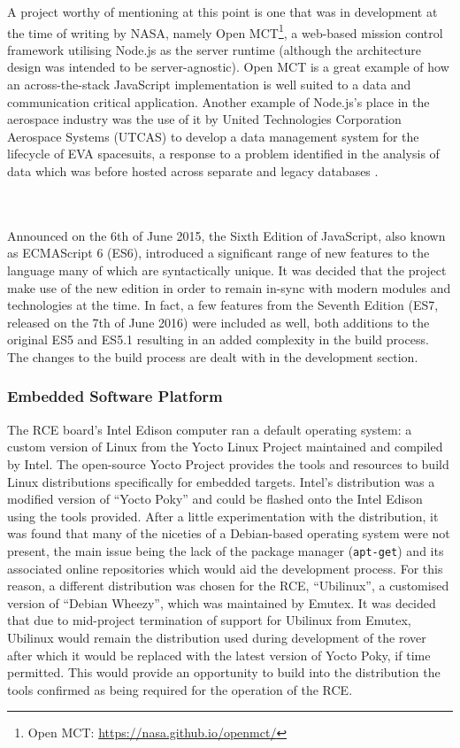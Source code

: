         A project worthy of mentioning at this point is one that was in development at the time of writing by NASA, namely Open MCT\footnote{Open MCT: \url{https://nasa.github.io/openmct/}}, a web-based mission control framework utilising Node.js as the server runtime (although the architecture design was intended to be server-agnostic). Open MCT is a great example of how an across-the-stack JavaScript implementation is well suited to a data and communication critical application. Another example of Node.js's place in the aerospace industry was the use of it by United Technologies Corporation Aerospace Systems (UTCAS) to develop a data management system for the lifecycle of EVA spacesuits, a response to a problem identified in the analysis of data which was before hosted across separate and legacy databases \cite{nodejsSpaceSuit_2016}.        
        
      \\\\
        Announced on the 6th of June 2015, the Sixth Edition of JavaScript, also known as ECMAScript 6 (ES6), introduced a significant range of new features to the language many of which are syntactically unique. It was decided that the project make use of the new edition in order to remain in-sync with modern modules and technologies at the time. In fact, a few features from the Seventh Edition (ES7, released on the 7th of June 2016) were included as well, both additions to the original ES5 and ES5.1 resulting in an added complexity in the build process. The changes to the build process are dealt with in the development section.
        
    \subsubsection{Embedded Software Platform}
      The RCE board's Intel Edison computer ran a default operating system: a custom version of Linux from the Yocto Linux Project maintained and compiled by Intel. The open-source Yocto Project provides the tools and resources to build Linux distributions specifically for embedded targets. Intel's distribution was a modified version of ``Yocto Poky'' and could be flashed onto the Intel Edison using the tools provided. After a little experimentation with the distribution, it was found that many of the niceties of a Debian-based operating system were not present, the main issue being the lack of the package manager (\texttt{apt-get}) and its associated online repositories which would aid the development process. For this reason, a different distribution was chosen for the RCE, ``Ubilinux'', a customised version of ``Debian Wheezy'', which was maintained by Emutex. It was decided that due to mid-project termination of support for Ubilinux from Emutex, Ubilinux would remain the distribution used during development of the rover after which it would be replaced with the latest version of Yocto Poky, if time permitted. This would provide an opportunity to build into the distribution the tools confirmed as being required for the operation of the RCE.
    
